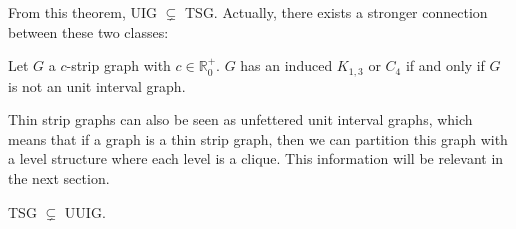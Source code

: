 From this theorem, UIG $\subsetneq$ TSG. Actually, there exists a stronger connection between these two classes:

\begin{theorem}
  \label{theo:induced_TSG}
  Let $G$ a $c$-strip graph with $c \in \mathbb{R}_0^+$. $G$ has an induced $K_{1,3}$ or $C_4$ if and only if $G$ is not an unit interval graph.
\end{theorem}

Thin strip graphs can also be seen as unfettered unit interval graphs, which means that if a graph is a thin strip graph, then we can partition this graph with a level structure where each level is a clique. This information will be relevant in the next section.

\begin{theorem}
  TSG $\subsetneq$ UUIG.
\end{theorem}

